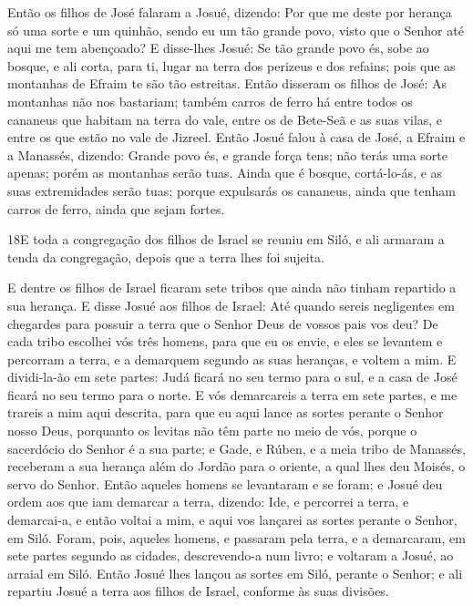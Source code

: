 Então os filhos de José falaram a Josué, dizendo: Por que me
deste por herança só uma sorte e um quinhão, sendo eu um tão grande
povo, visto que o Senhor até aqui me tem abençoado? E
disse-lhes Josué: Se tão grande povo és, sobe ao bosque, e ali
corta, para ti, lugar na terra dos perizeus e dos refains; pois que
as montanhas de Efraim te são tão estreitas. Então disseram
os filhos de José: As montanhas não nos bastariam; também carros de
ferro há entre todos os cananeus que habitam na terra do vale, entre
os de Bete-Seã e as suas vilas, e entre os que estão no vale de
Jizreel. Então Josué falou à casa de José, a Efraim e a
Manassés, dizendo: Grande povo és, e grande força tens; não terás
uma sorte apenas; porém as montanhas serão tuas. Ainda que é
bosque, cortá-lo-ás, e as suas extremidades serão tuas; porque
expulsarás os cananeus, ainda que tenham carros de ferro, ainda que
sejam fortes.


\medskip

\lettrine{18} E toda a congregação dos filhos de Israel se
reuniu em Siló, e ali armaram a tenda da congregação, depois que a
terra lhes foi sujeita.

E dentre os filhos de Israel ficaram sete tribos que ainda não
tinham repartido a sua herança. E disse Josué aos filhos de
Israel: Até quando sereis negligentes em chegardes para possuir a
terra que o Senhor Deus de vossos pais vos deu? De cada tribo
escolhei vós três homens, para que eu os envie, e eles se levantem e
percorram a terra, e a demarquem segundo as suas heranças, e voltem
a mim. E dividi-la-ão em sete partes: Judá ficará no seu termo
para o sul, e a casa de José ficará no seu termo para o norte. E
vós demarcareis a terra em sete partes, e me trareis a mim aqui
descrita, para que eu aqui lance as sortes perante o Senhor nosso
Deus, porquanto os levitas não têm parte no meio de vós, porque
o sacerdócio do Senhor é a sua parte; e Gade, e Rúben, e a meia
tribo de Manassés, receberam a sua herança além do Jordão para o
oriente, a qual lhes deu Moisés, o servo do Senhor. Então
aqueles homens se levantaram e se foram; e Josué deu ordem aos que
iam demarcar a terra, dizendo: Ide, e percorrei a terra, e
demarcai-a, e então voltai a mim, e aqui vos lançarei as sortes
perante o Senhor, em Siló. Foram, pois, aqueles homens, e
passaram pela terra, e a demarcaram, em sete partes segundo as
cidades, descrevendo-a num livro; e voltaram a Josué, ao arraial em
Siló. Então Josué lhes lançou as sortes em Siló, perante o
Senhor; e ali repartiu Josué a terra aos filhos de Israel, conforme
às suas divisões.

